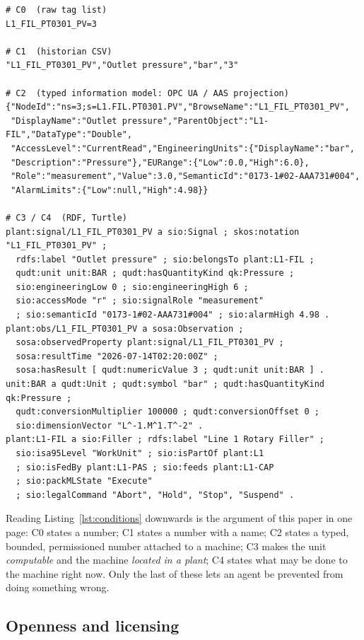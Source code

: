 \begin{lstlisting}[language=jsonl,float=*,floatplacement=t,caption={The Line 1
filler outlet pressure as each condition renders it. C0 and C1 are the whole
record; C2 and C3/C4 are excerpts. The information content differs, not merely
the syntax.},label={lst:conditions}]
# C0  (raw tag list)
L1_FIL_PT0301_PV=3

# C1  (historian CSV)
"L1_FIL_PT0301_PV","Outlet pressure","bar","3"

# C2  (typed information model: OPC UA / AAS projection)
{"NodeId":"ns=3;s=L1.FIL.PT0301.PV","BrowseName":"L1_FIL_PT0301_PV",
 "DisplayName":"Outlet pressure","ParentObject":"L1-FIL","DataType":"Double",
 "AccessLevel":"CurrentRead","EngineeringUnits":{"DisplayName":"bar",
 "Description":"Pressure"},"EURange":{"Low":0.0,"High":6.0},
 "Role":"measurement","Value":3.0,"SemanticId":"0173-1#02-AAA731#004",
 "AlarmLimits":{"Low":null,"High":4.98}}

# C3 / C4  (RDF, Turtle)
plant:signal/L1_FIL_PT0301_PV a sio:Signal ; skos:notation "L1_FIL_PT0301_PV" ;
  rdfs:label "Outlet pressure" ; sio:belongsTo plant:L1-FIL ;
  qudt:unit unit:BAR ; qudt:hasQuantityKind qk:Pressure ;
  sio:engineeringLow 0 ; sio:engineeringHigh 6 ;
  sio:accessMode "r" ; sio:signalRole "measurement"
  ; sio:semanticId "0173-1#02-AAA731#004" ; sio:alarmHigh 4.98 .
plant:obs/L1_FIL_PT0301_PV a sosa:Observation ;
  sosa:observedProperty plant:signal/L1_FIL_PT0301_PV ;
  sosa:resultTime "2026-07-14T02:20:00Z" ;
  sosa:hasResult [ qudt:numericValue 3 ; qudt:unit unit:BAR ] .
unit:BAR a qudt:Unit ; qudt:symbol "bar" ; qudt:hasQuantityKind qk:Pressure ;
  qudt:conversionMultiplier 100000 ; qudt:conversionOffset 0 ;
  sio:dimensionVector "L^-1.M^1.T^-2" .
plant:L1-FIL a sio:Filler ; rdfs:label "Line 1 Rotary Filler" ;
  sio:isa95Level "WorkUnit" ; sio:isPartOf plant:L1
  ; sio:isFedBy plant:L1-PAS ; sio:feeds plant:L1-CAP
  ; sio:packMLState "Execute"
  ; sio:legalCommand "Abort", "Hold", "Stop", "Suspend" .
\end{lstlisting}

Reading Listing~\ref{lst:conditions} downwards is the argument of this paper in
one page: C0 states a number; C1 states a number with a name; C2 states a typed,
bounded, permissioned number attached to a machine; C3 makes the unit
\emph{computable} and the machine \emph{located in a plant}; C4 states what may
be done to the machine right now. Only the last of these lets an agent be
prevented from doing something wrong.

\subsection{Openness and licensing}

